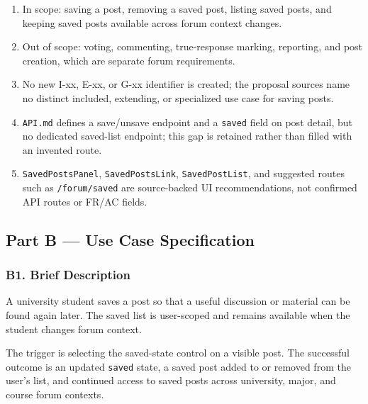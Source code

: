 \documentclass[12pt]{article}
\begin{document}
\begin{enumerate}
\item In scope: saving a post, removing a saved post, listing saved posts, and keeping saved posts available across forum context changes.
\item Out of scope: voting, commenting, true-response marking, reporting, and post creation, which are separate forum requirements.
\item No new I-xx, E-xx, or G-xx identifier is created; the proposal sources name no distinct included, extending, or specialized use case for saving posts.
\item \texttt{API.md} defines a save/unsave endpoint and a \texttt{saved} field on post detail, but no dedicated saved-list endpoint; this gap is retained rather than filled with an invented route.
\item \texttt{SavedPostsPanel}, \texttt{SavedPostsLink}, \texttt{SavedPostList}, and suggested routes such as \texttt{/forum/saved} are source-backed UI recommendations, not confirmed API routes or FR/AC fields.
\end{enumerate}
\par\medskip

\hypertarget{sec:part-b-use-case-specification}{}
\subsection*{Part B --- Use Case Specification}
\par\medskip

\hypertarget{sec:b1-brief-description}{}
\subsubsection*{B1. Brief Description}
\par\medskip

A university student saves a post so that a useful discussion or material can be found again later. The saved list is user-scoped and remains available when the student changes forum context.
\par\medskip

The trigger is selecting the saved-state control on a visible post. The successful outcome is an updated \texttt{saved} state, a saved post added to or removed from the user's list, and continued access to saved posts across university, major, and course forum contexts.
\par\medskip
\end{document}
